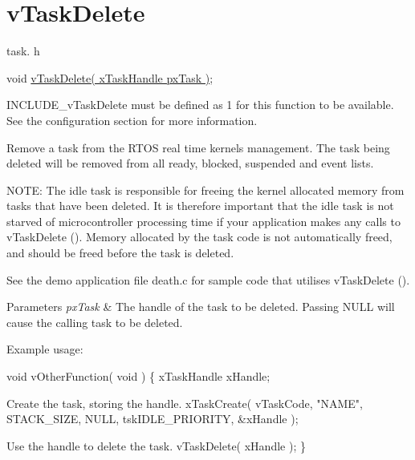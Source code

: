 \hypertarget{group__v_task_delete}{\section{v\-Task\-Delete}
\label{group__v_task_delete}
}
task. h 
\begin{DoxyPre}void \hyperlink{win32_2win32_2_libraries_2_free_r_t_o_s_2_source_2tasks_8c_a0cb4f94c57e14413220359afe4ae9620}{vTaskDelete( xTaskHandle pxTask )};\end{DoxyPre}


I\-N\-C\-L\-U\-D\-E\-\_\-v\-Task\-Delete must be defined as 1 for this function to be available. See the configuration section for more information.

Remove a task from the R\-T\-O\-S real time kernels management. The task being deleted will be removed from all ready, blocked, suspended and event lists.

N\-O\-T\-E\-: The idle task is responsible for freeing the kernel allocated memory from tasks that have been deleted. It is therefore important that the idle task is not starved of microcontroller processing time if your application makes any calls to v\-Task\-Delete (). Memory allocated by the task code is not automatically freed, and should be freed before the task is deleted.

See the demo application file death.\-c for sample code that utilises v\-Task\-Delete ().


\begin{DoxyParams}{Parameters}
{\em px\-Task} & The handle of the task to be deleted. Passing N\-U\-L\-L will cause the calling task to be deleted.\\
\hline
\end{DoxyParams}
Example usage\-: 
\begin{DoxyPre}
 void vOtherFunction( void )
 \{
 xTaskHandle xHandle;\end{DoxyPre}



\begin{DoxyPre}Create the task, storing the handle.
         xTaskCreate( vTaskCode, "NAME", STACK\_SIZE, NULL, tskIDLE\_PRIORITY, \&xHandle );\end{DoxyPre}



\begin{DoxyPre}Use the handle to delete the task.
         vTaskDelete( xHandle );
 \}
   \end{DoxyPre}
 